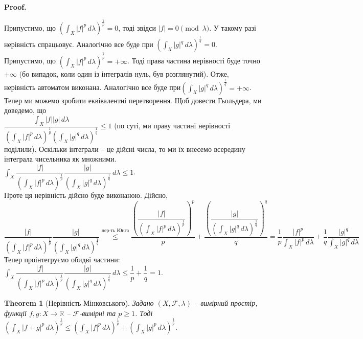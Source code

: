 \documentclass[a4paper, 10pt]{article}
\makeatletter
\theoremstyle{theoremdd}
\newtheorem{theorem}{Theorem}[subsection]
\renewenvironment{proof}[1][Proof.\\]{\par
\pushQED{\hfill \qed}%
\normalfont \topsep6\p@\@plus6\p@\relax
\trivlist
\item\relax
{\bfseries
#1\@addpunct{.}}\hspace\labelsep\ignorespaces
}{%
\popQED\endtrivlist\@endpefalse
}
\makeatother
\begin{document}
\begin{proof}
Припустимо, що $\displaystyle \left(\int_X |f|^p\,d\lambda \right)^{\frac{1}{p}} = 0$, тоді звідси $|f| = 0 \pmod \lambda$. У такому разі нерівність спрацьовує. Аналогічно все буде при $\displaystyle \left(\int_X |g|^q\,d\lambda \right)^{\frac{1}{q}} = 0$.\\
Припустимо, що $\displaystyle \left(\int_X |f|^p\,d\lambda \right)^{\frac{1}{p}} = +\infty$. Тоді права частина нерівності буде точно $+\infty$ (бо випадок, коли один із інтегралів нуль, був розглянутий). Отже, нерівність автоматом виконана. Аналогічно все буде при$\displaystyle \left(\int_X |g|^q\,d\lambda \right)^{\frac{1}{q}} = +\infty$.
\bigskip \\
Тепер ми можемо зробити еквівалентні перетворення. Щоб довести Гьольдера, ми доведемо, що \\ $\dfrac{\displaystyle \int_X |f| |g|\,d\lambda}{\displaystyle\left(\int_X |f|^p\,d\lambda \right)^{\frac{1}{p}} \left(\int_X |g|^q\,d\lambda \right)^{\frac{1}{q}}} \leq 1$ (по суті, ми праву частині нерівності поділили). Оскільки інтеграли -- це дійсні числа, то ми їх внесемо всередину інтеграла чисельника як множними.\\
$\displaystyle\int_X \dfrac{|f|}{\left(\int_X |f|^p\,d\lambda \right)^{\frac{1}{p}}} \dfrac{|g|}{\left(\int_X |g|^q\,d\lambda \right)^{\frac{1}{q}}}\,d\lambda \leq 1$.\\
Проте ця нерівність дійсно буде виконаною. Дійсно,\\
$\dfrac{|f|}{\left(\int_X |f|^p\,d\lambda \right)^{\frac{1}{p}}} \dfrac{|g|}{\left(\int_X |g|^q\,d\lambda \right)^{\frac{1}{q}}} \overset{\text{нер-ть Юнга}}{\leq} \dfrac{\left( \displaystyle \dfrac{|f|}{\left(\int_X |f|^p\,d\lambda \right)^{\frac{1}{p}}} \right)^p}{p} + \dfrac{\left( \displaystyle \dfrac{|g|}{\left(\int_X |g|^q\,d\lambda \right)^{\frac{1}{q}}} \right)^q}{q} = \dfrac{1}{p} \dfrac{|f|^p}{\displaystyle \int_X |f|^p\,d\lambda} + \dfrac{1}{q} \dfrac{|g|^q}{\displaystyle \int_X |g|^q\,d\lambda}$\\
Тепер проінтегруємо обидві частини:\\
$\displaystyle\int_X \dfrac{|f|}{\left(\int_X |f|^p\,d\lambda \right)^{\frac{1}{p}}} \dfrac{|g|}{\left(\int_X |g|^q\,d\lambda \right)^{\frac{1}{q}}}\,d\lambda \leq \dfrac{1}{p} + \dfrac{1}{q} = 1$.
\end{proof}

\begin{theorem}[Нерівність Мінковського]
Задано $(X,\mathcal{F},\lambda)$ -- вимірний простір, функції $f,g \colon X \to \mathbb{R}$ -- $\mathcal{F}$-вимірні та $p \geq 1$. Тоді\\
$\displaystyle \left( \int_X|f+g|^p\,d\lambda \right)^{\frac{1}{p}} \leq \left( \int_X|f|^p\,d\lambda \right)^{\frac{1}{p}} + \left( \int_X|g|^p\,d\lambda \right)^{\frac{1}{p}}$.
\end{theorem}
\end{document}
